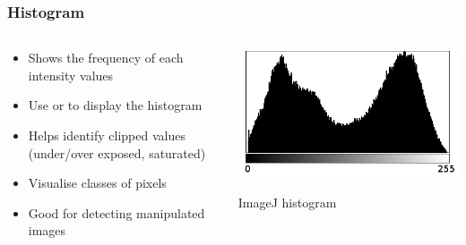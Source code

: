 \documentclass[ignorenonframetext,aspectratio=169,10pt,xcolor=table]{beamer}
\begin{document}
\begin{frame} \frametitle{Histogram}

  \begin{columns}

    \begin{column}{0.5\textwidth}
      \begin{itemize}\setlength\itemsep{1em}
      \item Shows the frequency of each intensity values
      \item Use  or  to display the
        histogram
      \item Helps identify clipped values (under/over exposed, saturated)
      \item Visualise classes of pixels
      \item Good for detecting manipulated images
      \end{itemize}
    \end{column}

    \begin{column}{0.5\textwidth}
      \begin{center}
        \includegraphics[width=\textwidth]{histogram}

        {\tiny ImageJ histogram}
      \end{center}
    \end{column}

  \end{columns}

\end{frame}
\end{document}
